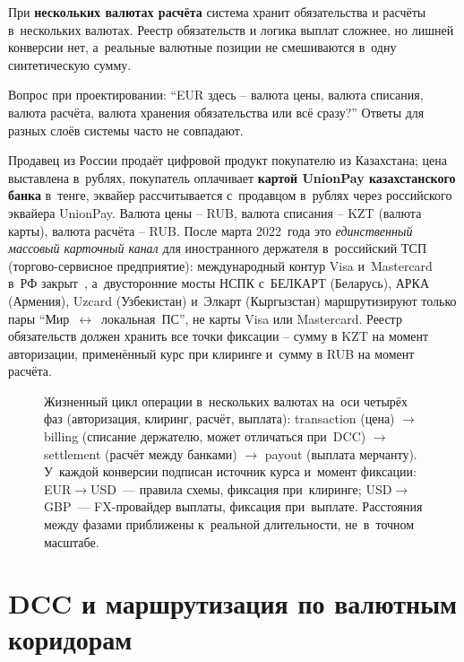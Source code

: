 При \textbf{нескольких валютах расчёта} система хранит обязательства
и расчёты в~нескольких валютах. Реестр обязательств и логика
выплат сложнее, но лишней конверсии нет, а~реальные валютные
позиции не смешиваются в~одну синтетическую сумму.

Вопрос при проектировании: \enquote{EUR здесь --
  валюта цены, валюта списания,
валюта расчёта, валюта хранения обязательства или всё сразу?}
Ответы для разных слоёв системы часто не совпадают.

Продавец из России продаёт цифровой продукт покупателю
из Казахстана; цена выставлена в~рублях, покупатель
оплачивает \textbf{картой UnionPay казахстанского банка} в~тенге,
эквайер рассчитывается с~продавцом в~рублях через российского
эквайера UnionPay. Валюта цены -- RUB, валюта списания -- KZT
(валюта карты), валюта расчёта -- RUB. После марта 2022~года
это \textit{единственный массовый карточный канал} для иностранного
держателя в~российский ТСП (торгово-сервисное предприятие):
международный контур Visa и~Mastercard в~РФ закрыт~\cite{cbr-ps,nspk-mir-rules},
а~двусторонние мосты НСПК с~БЕЛКАРТ (Беларусь), АРКА (Армения),
Uzcard (Узбекистан) и~Элкарт (Кыргызстан) маршрутизируют
только пары \enquote{Мир~$\leftrightarrow$~локальная~ПС}, не карты Visa или
Mastercard. Реестр обязательств должен хранить все точки фиксации --
сумму в KZT на момент авторизации, применённый курс при клиринге
и~сумму в RUB на момент расчёта.

\begin{figure}[tbp]
  \centering
  \caption{Жизненный цикл операции в~нескольких валютах на~оси
    четырёх фаз (авторизация, клиринг, расчёт, выплата):
    transaction (цена) $\to$ billing (списание держателю, может отличаться
    при~DCC) $\to$ settlement (расчёт между банками) $\to$ payout
    (выплата мерчанту). У~каждой конверсии подписан источник курса
    и~момент фиксации: EUR$\to$USD~--- правила схемы, фиксация
    при~клиринге; USD$\to$GBP~--- FX-провайдер выплаты, фиксация
    при~выплате. Расстояния между фазами приближены к~реальной
    длительности, не~в~точном масштабе.}\label{fig:three-currencies-timeline}
\end{figure}

\section{DCC и маршрутизация по валютным коридорам}\label{sec:mc-dcc}

